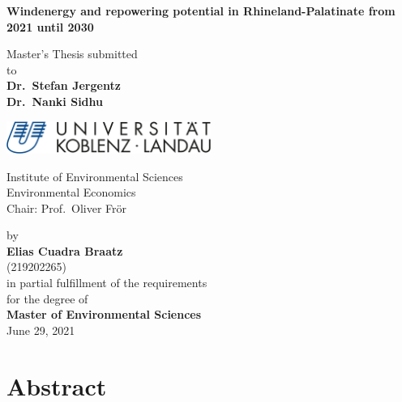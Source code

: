 \documentclass[a4paper,11pt]{article}
\begin{document}
\thispagestyle{empty}
\begin{center}
  \vspace*{5mm}
  \linespread{1.5}
  {\huge{\bf Windenergy and repowering potential in Rhineland-Palatinate from 2021 until 2030}\par}\vspace{1cm}
  Master's Thesis submitted \\\vspace{0.5cm}
  to \\\vspace{0.5cm}
  \textbf{Dr.~Stefan Jergentz} \\
  \textbf{Dr.~Nanki Sidhu} \\\vspace{1.5cm}
  
  
  \includegraphics[width=0.5\textwidth]{Uni-Logo-2.jpg}
  
  Institute of Environmental Sciences \\
  Environmental Economics \\
   Chair: Prof.~Oliver Frör \\  \vspace{1cm}

  
  
  by \\\vspace{0.5cm}
  \textbf{Elias Cuadra Braatz} \\
  (219202265) \\
  
  \medskip
  \medskip
  in partial fulfillment of the requirements \\
  for the degree of \\
  \textbf{Master of Environmental Sciences} \\\vspace{0.5cm}
  June 29, 2021
  
\end{center}


\newpage
\tableofcontents
\clearpage

\newpage
\hypertarget{abstract}{%
\section*{Abstract}\label{abstract}}
\end{document}
